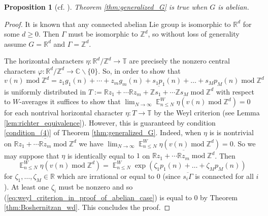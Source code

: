 \documentclass[12pt]{article}
\theoremstyle{plain} %
\newtheorem{proposition}[theorem]{Proposition}
\theoremstyle{definition} %
\theoremstyle{plain}
\theoremstyle{plain}
\numberwithin{equation}{section}
\newcommand{\Z}{\mathbb{Z}}
\newcommand{\R}{\mathbb{R}}
\newcommand{\C}{\mathbb{C}}
\newcommand{\T}{\mathbb{T}}
\renewcommand{\leq}{\leqslant}
\renewcommand{\geq}{\geqslant}
\renewcommand{\setminus}{\backslash}
\newcommand{\1}{\mathbbm{1}}
\newcommand{\E}{\operatorname{\mathbb{E}}}
\newcommand{\oo}{\infty}
\renewcommand{\mod}{\operatorname{mod}}
\begin{document}
\begin{proposition}[cf. {\cite[Theorem  4.1]{Richter23}}]\label{prop:abelian_case}
    Theorem \ref{thm:generalized_G} is true when $G$ is abelian.
\end{proposition}
\begin{proof}
It is known that any connected abelian Lie group is isomorphic to $\R^{d}$ for some $d\geq 0$. Then $\Gamma$ must be isomorphic to $\mathbb{Z}^{d}$, so without loss of generality assume $G = \R^d$ and $\Gamma = \mathbb{Z}^{d}$.


The horizontal characters $\eta:\R^d/\Z^d\rightarrow \T$ are precisely the nonzero central characters $\varphi:\R^d/\Z^d\rightarrow \C\setminus \{0\}$. So, in order to show that
\begin{equation*}
    v(n) \mod \Z^d= z_1g_1(n)+\cdots +z_{m}g_{m}(n)+s_1p_1(n)+\dots+s_Mp_M(n)\mod \Z^d
\end{equation*}
is uniformly distributed in $T:=\overline{\R z_1+\cdots \R z_{m}+\Z s_1+\cdots \Z s_{M}\mod \Z^{d}}$ with respect to $W$-averages it suffices to show that $ \lim_{N\to\oo}\E_{n\leq N}^W\eta( v(n)\mod \Z^d) = 0$ for each nontrival horizontal character $\eta:T\rightarrow \T$ by the Weyl criterion (see Lemma \ref{lem:richter_equivalence}). However, this is guaranteed by condition \ref{condition_(4)} of Theorem \ref{thm:generalized_G}. Indeed, when $\eta$ is is nontrivial on $\overline{\R z_1+\cdots \R z_{m}\mod \Z^{d}}$ we have $\lim_{N\to\oo}\E_{n\leq N}^W\eta( v(n)\mod \Z^d)=0$. So we may suppose that $\eta$ is identically equal to $1$ on $\overline{\R z_1+\cdots \R z_{m}\mod \Z^{d}}$. Then 
\begin{equation}\label{eq:weyl_criterion_in_proof_of_abelian_case}
   \E_{n\leq N}^W\eta( v(n)\mod \Z^d)=\E_{n\leq N}^W\exp( \zeta_1p_1(n)+\dots+\zeta_Mp_M(n))
\end{equation}
for $\zeta_{1},\dots, \zeta_M\in \R$ which are irrational or equal to $0$ (since $\overline{s_i\Gamma}$ is connected for all $i$). At least one $\zeta_i$ must be nonzero and so (\ref{eq:weyl_criterion_in_proof_of_abelian_case}) is equal to $0$ by Theorem \ref{thm:Boshernitzan_wd}. This concludes the proof.

\end{proof}
\end{document}
